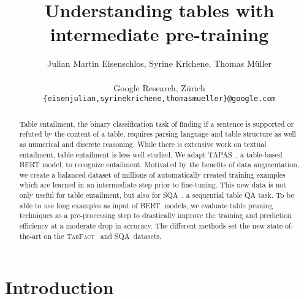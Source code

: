 \documentclass[11pt,a4paper]{article}
\title{Understanding tables with intermediate pre-training}
\author{Julian Martin Eisenschlos, Syrine Krichene, Thomas M{\"u}ller \\ \\
  Google Research, Z{\"u}rich \\
  \texttt{\{eisenjulian,syrinekrichene,thomasmueller\}@google.com}}
\date{}
\newcommand{\sqa}{\textsc{SQA}\xspace}
\newcommand{\tabfact}{\textsc{TabFact}\xspace}
\newcommand\sota{state-of-the-art\xspace}
\newcommand{\tapas}{\textsc{TAPAS}\xspace}
\newcommand{\bert}{\textsc{BERT}\xspace}
\theoremstyle{definition}
\begin{document}
\maketitle

\begin{abstract}
    

Table entailment, the binary classification task of finding if a sentence is supported or refuted by the content of a table, requires parsing language and table structure as well as numerical and discrete reasoning.
While there is extensive work on textual entailment, table entailment is less well studied.
We adapt \tapas~\cite{herzig-2020}, a table-based \bert model, to recognize entailment. 
Motivated by the benefits of data augmentation, we create a balanced dataset of millions of automatically created training examples which are learned in an intermediate step prior to fine-tuning.
This new data is not only useful for table entailment, but also for \sqa~\cite{iyyer-etal-2017-search}, a sequential table QA task.
To be able to use long examples as input of \bert~models, we evaluate table pruning techniques as a pre-processing step to drastically improve the training and prediction efficiency at a moderate drop in accuracy.
The different methods set the new \sota on the \tabfact~\cite{2019TabFactA} and \sqa~datasets. \end{abstract}


\section{Introduction}
\label{sec:intro}
\end{document}

